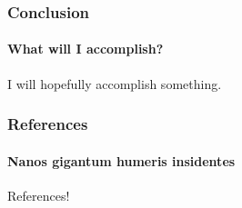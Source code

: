 \documentclass{beamer}
\begin{document}
\begin{frame}
	\frametitle{Conclusion}
	\framesubtitle{What will I accomplish?}
	I will hopefully accomplish something.
\end{frame}

\begin{frame}
	\frametitle{References}
	\framesubtitle{Nanos gigantum humeris insidentes}
	References!
\end{frame}
\end{document}
